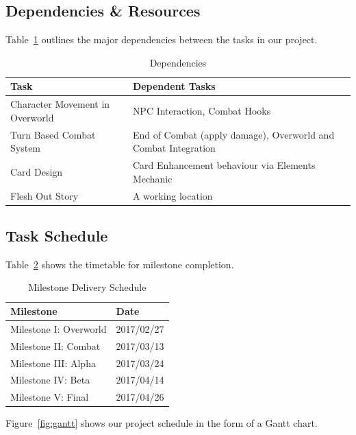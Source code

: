 \documentclass[12pt,titlepage]{article}
\begin{document}
\subsection{Dependencies \& Resources}
Table~\ref{tab:dependencies} outlines the major dependencies between the tasks
in our project.
\begin{table}[H]
    \caption{Dependencies}
    \label{tab:dependencies}
    \centering
    \begin{tabularx}{\linewidth}{|l|X|}
        \hline
        \textbf{Task} & \textbf{Dependent Tasks} \\
        \hline
        Character Movement in Overworld & NPC Interaction, Combat Hooks \\
        \hline
        Turn Based Combat System & End of Combat (apply damage), Overworld and
        Combat Integration \\
        \hline
        Card Design & Card Enhancement behaviour via Elements Mechanic \\
        \hline
        Flesh Out Story & A working location \\
        \hline
    \end{tabularx}
\end{table}

\subsection{Task Schedule}
Table~\ref{tab:schedule} shows the timetable for milestone completion.
\begin{table}[H]
    \caption{Milestone Delivery Schedule}
    \label{tab:schedule}
    \centering
    \begin{tabular}{|l|l|}
        \hline
        \textbf{Milestone} & \textbf{Date} \\
        \hline
        Milestone I: Overworld & 2017/02/27 \\
        \hline
        Milestone II: Combat & 2017/03/13 \\
        \hline
        Milestone III: Alpha & 2017/03/24 \\
        \hline
        Milestone IV: Beta & 2017/04/14 \\
        \hline
        Milestone V: Final & 2017/04/26 \\
        \hline
    \end{tabular}
\end{table}

Figure~\ref{fig:gantt} shows our project schedule in the form of a Gantt chart.
\end{document}
